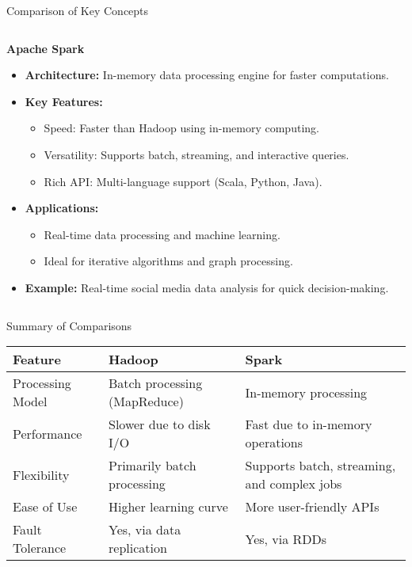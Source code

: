 \documentclass[aspectratio=169]{beamer}
\begin{document}
\begin{frame}{Comparison of Key Concepts}
\begin{columns}
        \begin{column}{0.5\textwidth}
            \textbf{Apache Spark}
            \begin{itemize}
                \item \textbf{Architecture:} In-memory data processing engine for faster computations.
                \item \textbf{Key Features:}
                    \begin{itemize}
                        \item Speed: Faster than Hadoop using in-memory computing.
                        \item Versatility: Supports batch, streaming, and interactive queries.
                        \item Rich API: Multi-language support (Scala, Python, Java).
                    \end{itemize}
                \item \textbf{Applications:}
                    \begin{itemize}
                        \item Real-time data processing and machine learning.
                        \item Ideal for iterative algorithms and graph processing.
                    \end{itemize}
                \item \textbf{Example:} Real-time social media data analysis for quick decision-making.
            \end{itemize}
        \end{column}
    \end{columns}
\end{frame}

\begin{frame}{Summary of Comparisons}
    \begin{table}[ht]
        \centering
        \begin{tabular}{|l|l|l|}
            \hline
            \textbf{Feature} & \textbf{Hadoop} & \textbf{Spark} \\ \hline
            Processing Model & Batch processing (MapReduce) & In-memory processing \\ \hline
            Performance & Slower due to disk I/O & Fast due to in-memory operations \\ \hline
            Flexibility & Primarily batch processing & Supports batch, streaming, and complex jobs \\ \hline
            Ease of Use & Higher learning curve & More user-friendly APIs \\ \hline
            Fault Tolerance & Yes, via data replication & Yes, via RDDs \\ \hline
        \end{tabular}
    \end{table}
\end{frame}
\end{document}
